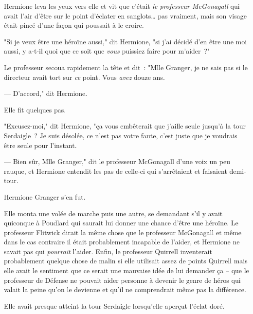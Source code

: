 Hermione leva les yeux vers elle et vit que c'était \emph{le professeur McGonagall} qui avait l'air d'être sur le point d'éclater en sanglots… pas vraiment, mais son visage était pincé d'une façon qui poussait à le croire.

"Si je veux être une héroïne aussi," dit Hermione, "si j'ai décidé d'en être une moi aussi, y a-t-il quoi que ce soit que \emph{vous} puissiez faire pour m'aider~?"

Le professeur secoua rapidement la tête et dit~: "Mlle Granger, je ne sais pas si le directeur avait tort sur \emph{ce} point. Vous \emph{avez} douze ans.

--- D'accord," dit Hermione.

Elle fit quelques pas.

"Excusez-moi," dit Hermione, "ça vous embêterait que j'aille seule jusqu'à la tour Serdaigle~? Je suis désolée, ce n'est pas votre faute, c'est juste que je voudrais être seule pour l'instant.

--- Bien sûr, Mlle Granger," dit le professeur McGonagall d'une voix un peu rauque, et Hermione entendit les pas de celle-ci qui s'arrêtaient et faisaient demi-tour.

Hermione Granger s'en fut.

Elle monta une volée de marche puis une autre, se demandant s'il y avait quiconque à Poudlard qui saurait lui donner une chance d'être une héroïne. Le professeur Flitwick dirait la même chose que le professeur McGonagall et même dans le cas contraire il était probablement incapable de l'aider, et Hermione ne savait pas qui \emph{pourrait} l'aider. Enfin, le professeur Quirrell inventerait probablement quelque chose de malin si elle utilisait assez de points Quirrell mais elle avait le sentiment que ce serait une mauvaise idée de lui demander ça -- que le professeur de Défense ne pouvait aider personne à devenir le genre de héros qui valait la peine qu'on le devienne et qu'il ne comprendrait même pas la différence.

Elle avait presque atteint la tour Serdaigle lorsqu'elle aperçut l'éclat doré. 


